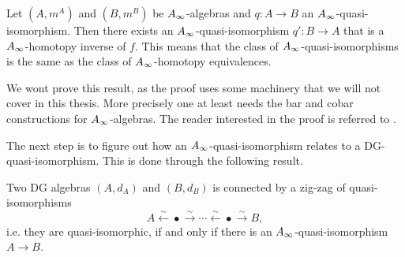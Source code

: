 \begin{proposition}
Let $(A, m^A)$ and $(B, m^B)$ be $A_{\infty}$-algebras and $q:A\rightarrow B$ an $A_{\infty}$-quasi-isomorphism. Then there exists an $A_{\infty}$-quasi-isomorphism $q':B\rightarrow A$ that is a $A_{\infty}$-homotopy inverse of $f$. This means that the class of $A_{\infty}$-quasi-isomorphisms is the same as the class of $A_{\infty}$-homotopy equivalences. 
\label{prop:infty-q.i._are_homotopy_invertible}
\end{proposition}

We wont prove this result, as the proof uses some machinery that we will not cover in this thesis. More precisely one at least needs the bar and cobar constructions for $A_{\infty}$-algebras. The reader interested in the proof is referred to \cite[Corollary 1.3.1.3]{french1}. 

The next step is to figure out how an $A_{\infty}$-quasi-isomorphism relates to a DG-quasi-isomorphism. This is done through the following result.

\begin{corollary}
Two DG algebras $(A, d_A)$ and $(B, d_B)$ is connected by a zig-zag of quasi-isomorphisms
\begin{equation*}
    A \overset{\sim}\longleftarrow \bullet \overset{\sim}\longrightarrow \cdots \overset{\sim}\longleftarrow \bullet \overset{\sim}\longrightarrow B, 
\end{equation*}
i.e. they are quasi-isomorphic, if and only if there is an $A_{\infty}$-quasi-isomorphism $A\rightarrow B$. 
\label{lem:zigzag-quasi}
\end{corollary}

